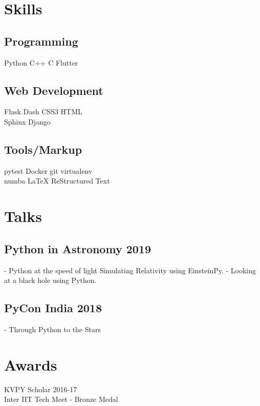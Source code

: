 \documentclass[a4paper]{deedy-resume-openfont}
\begin{document}
\begin{minipage}[t]{0.33\textwidth}

\section{Skills}
\subsection{Programming}
Python \textbullet{}  C++ \textbullet{} C \textbullet{}
Flutter \\ 
\subsection{Web Development}
Flask \textbullet{}  Dash \textbullet{} CSS3 \textbullet{} HTML\\
Sphinx \textbullet{} Django\\
\subsection{Tools/Markup}
pytest  \textbullet{} Docker\textbullet{} 
git \textbullet{}  virtualenv \\  numba \textbullet{} \textbullet{}
\LaTeX \textbullet{} ReStructured Text \\

\section{Talks} 

\subsection{Python in Astronomy 2019}
- Python at the speed of light Simulating Relativity using EinsteinPy.
- Looking at a black hole using Python. 

\subsection{PyCon India 2018}
- Through Python to the Stars



\section{Awards}
KVPY Scholar 2016-17\\
Inter IIT Tech Meet - Bronze Medal\\



\end{minipage}
\end{document}
